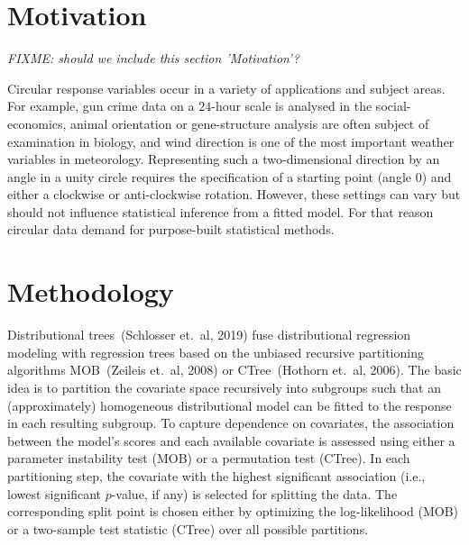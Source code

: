 \documentclass[twoside]{report}
\begin{document}


\section{Motivation}
\textit{FIXME: should we include this section 'Motivation'?}

Circular response variables occur in a variety of applications and subject areas. 
For example, gun crime data on a $24$-hour scale is analysed in the social-economics, 
animal orientation or gene-structure analysis are often subject of examination in biology, 
and wind direction is one of the most important weather variables in meteorology.
Representing such a two-dimensional direction by an angle in a unity circle requires 
the specification of a starting point (angle 0) and either a clockwise or anti-clockwise 
rotation. However, these settings can vary but should not influence statistical 
inference from a fitted model.
For that reason circular data demand for purpose-built statistical methods. 

\section{Methodology}

Distributional trees~(Schlosser et.~al, 2019) fuse distributional regression modeling with
regression trees based on the unbiased recursive partitioning algorithms MOB~(Zeileis et.~al, 2008)
or CTree~(Hothorn et.~al, 2006). The basic idea is to partition the covariate space recursively into 
subgroups such that an (approximately) homogeneous distributional model can be fitted to the response 
in each resulting subgroup.
To capture dependence on covariates, the association between the model's scores and each available
covariate is assessed using either a parameter instability test (MOB) or a permutation test (CTree).
In each partitioning step, the covariate with the highest significant association (i.e., lowest
significant $p$-value, if any) is selected for splitting the data. The corresponding split point
is chosen either by optimizing the log-likelihood (MOB) or a two-sample test statistic (CTree)
over all possible partitions.
\end{document}
